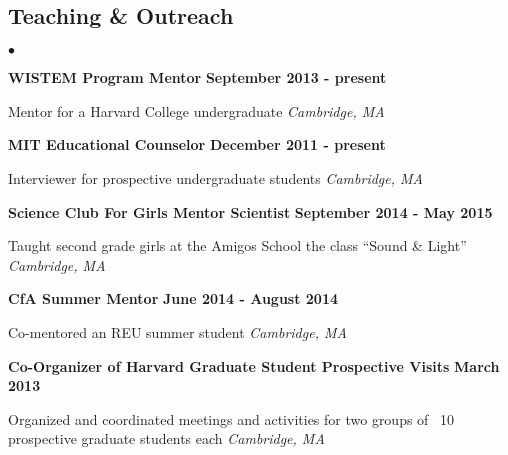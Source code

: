 \documentclass[margin,line]{res}
\newenvironment{list1}{
  \begin{list}{\ding{113}}{%
      \setlength{\itemsep}{0in}
      \setlength{\parsep}{0in} \setlength{\parskip}{0in}
      \setlength{\topsep}{0in} \setlength{\partopsep}{0in} 
      \setlength{\leftmargin}{0.17in}}}{\end{list}}
\newenvironment{list2}{
  \begin{list}{$\bullet$}{%
      \setlength{\itemsep}{0in}
      \setlength{\parsep}{0in} \setlength{\parskip}{0in}
      \setlength{\topsep}{0in} \setlength{\partopsep}{0in} 
      \setlength{\leftmargin}{0.2in}}}{\end{list}}
\begin{document}
\begin{resume}
\section{\sc Teaching \& Outreach}
\begin{list2}

\item[] {\bf WISTEM Program Mentor} \hfill {\bf September 2013 - present}
\begin{list1}
\item[] Mentor for a Harvard College undergraduate \hfill \textit{Cambridge, MA}
\end{list1}

\vspace{0.2in}

\item[] {\bf MIT Educational Counselor} \hfill {\bf December 2011 - present}
\begin{list1}
\item[] Interviewer for prospective undergraduate students \hfill \textit{Cambridge, MA}
\end{list1}

\vspace{0.2in}

\item[] {\bf Science Club For Girls Mentor Scientist} \hfill { \bf September 2014 - May 2015}
\begin{list1}
\item[] Taught second grade girls at the Amigos School the class ``Sound \& Light'' \hfill \textit{Cambridge, MA}
\end{list1}



\vspace{0.2in}

\item[] {\bf CfA Summer Mentor} \hfill {\bf June 2014 - August 2014}
\begin{list1}
\item[] Co-mentored an REU summer student \hfill \textit{Cambridge, MA}
\end{list1}

\vspace{0.2in}

\item[] {\bf Co-Organizer of Harvard Graduate Student Prospective Visits} \hfill {\bf March 2013}
\begin{list1}
\item[] Organized and coordinated meetings and activities for two groups of ~10 prospective graduate students each \hfill \textit{Cambridge, MA}
\end{list1}


\end{list2}
\end{resume}
\end{document}
